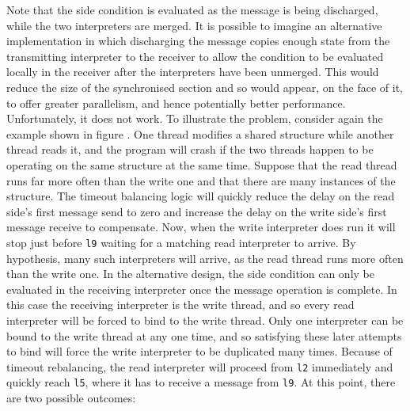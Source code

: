   Note that the side condition is evaluated as the
message is being discharged, while the two interpreters are merged.
It is possible to imagine an alternative implementation in which
discharging the message copies enough state from the transmitting
interpreter to the receiver to allow the condition to be evaluated
locally in the receiver after the interpreters have been unmerged.
This would reduce the size of the synchronised section and so would
appear, on the face of it, to offer greater parallelism, and hence
potentially better performance.  Unfortunately, it does not work.  To
illustrate the problem, consider again the example shown in figure
.  One thread modifies a shared structure while another
thread reads it, and the program will crash if the two threads happen
to be operating on the same structure at the same time.  Suppose that
the read thread runs far more often than the write one and that there
are many instances of the structure.  The timeout balancing logic will
quickly reduce the delay on the read side's first message send to zero
and increase the delay on the write side's first message receive to
compensate.  Now, when the write interpreter does run it will stop
just before \verb|l9| waiting for a matching read interpreter to
arrive.  By hypothesis, many such interpreters will arrive, as the
read thread runs more often than the write one.  In the alternative
design, the side condition can only be evaluated in the receiving
interpreter once the message operation is complete.  In this case the
receiving interpreter is the write thread, and so every read
interpreter will be forced to bind to the write thread.  Only one
interpreter can be bound to the write thread at any one time, and so
satisfying these later attempts to bind will force the write
interpreter to be duplicated many times.  Because of timeout
rebalancing, the read interpreter will proceed from \verb|l2|
immediately and quickly reach \verb|l5|, where it has to receive a
message from \verb|l9|.  At this point, there are two possible
outcomes:

